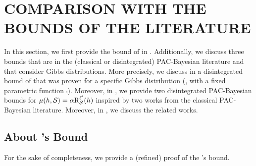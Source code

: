 \documentclass[twoside]{article}
\theoremstyle{plain}
\begin{document}
\section{COMPARISON WITH THE BOUNDS OF THE LITERATURE}
\label{sec:comparison-literature}

In this section, we first provide the bound of \citet{lee2020neural} in .
Additionally, we discuss three bounds that are in the (classical or disintegrated) PAC-Bayesian literature and that consider Gibbs distributions.
More precisely, we discuss in  a disintegrated bound of \citet[Section 1.2.4]{catoni2007pac} that was proven for a specific Gibbs distribution (\ie, with a fixed parametric function $\comp$).
Moreover, in , we provide two disintegrated PAC-Bayesian bounds for $\mu(h,\mathcal{S})=\alpha\text{R}^{\ell'}_{\mathcal{S}}(h)$ inspired by two works from the classical PAC-Bayesian literature.
Moreover, in , we discuss the related works.

\subsection[About Lee et al. {[2020]}’s Bound]{About \citet{lee2020neural}'s Bound}
\label{sec:comparison-lee}

For the sake of completeness, we provide a (refined) proof of the \citet{lee2020neural}'s bound.
\end{document}
